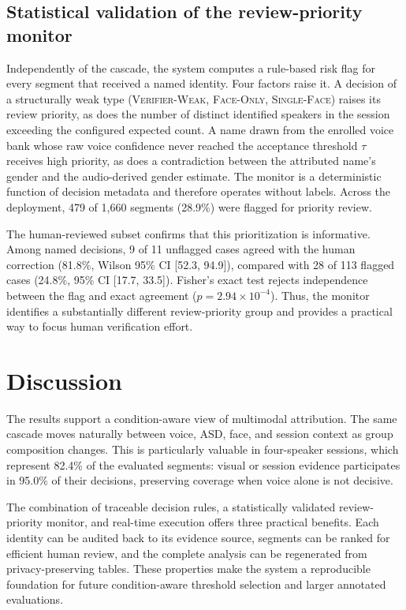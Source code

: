 \documentclass[conference]{IEEEtran}
\begin{document}
\subsection{Statistical validation of the review-priority monitor}
\label{sec:fprisk}

Independently of the cascade, the system computes a rule-based risk
flag for every segment that received a named identity. Four factors
raise it. A decision of a structurally weak type
(\textsc{Verifier-Weak}, \textsc{Face-Only}, \textsc{Single-Face})
raises its review priority, as does the number of distinct identified speakers
in the session exceeding the configured expected count. A name drawn
from the enrolled voice bank whose raw voice confidence never reached
the acceptance threshold $\tau$ receives high priority, as does a
contradiction between the attributed name's gender and the
audio-derived gender estimate. The monitor is a deterministic function
of decision metadata and therefore operates without labels. Across the
deployment, 479 of 1{,}660 segments (28.9\%) were flagged for priority
review.

The human-reviewed subset confirms that this prioritization is
informative. Among named decisions, 9 of 11 unflagged cases agreed with
the human correction (81.8\%, Wilson 95\% CI [52.3, 94.9]), compared
with 28 of 113 flagged cases (24.8\%, 95\% CI [17.7, 33.5]). Fisher's
exact test rejects independence between the flag and exact agreement
($p=2.94\times10^{-4}$). Thus, the monitor identifies a substantially
different review-priority group and provides a practical way to focus
human verification effort.

\section{Discussion}

The results support a condition-aware view of multimodal attribution.
The same cascade moves naturally between voice, ASD, face, and session
context as group composition changes. This is particularly valuable in
four-speaker sessions, which represent 82.4\% of the evaluated
segments: visual or session evidence participates in 95.0\% of their
decisions, preserving coverage when voice alone is not decisive.

The combination of traceable decision rules, a statistically validated
review-priority monitor, and real-time execution offers three practical
benefits. Each identity can be audited back to its evidence source,
segments can be ranked for efficient human review, and the complete
analysis can be regenerated from privacy-preserving tables. These
properties make the system a reproducible foundation for future
condition-aware threshold selection and larger annotated evaluations.
\end{document}
